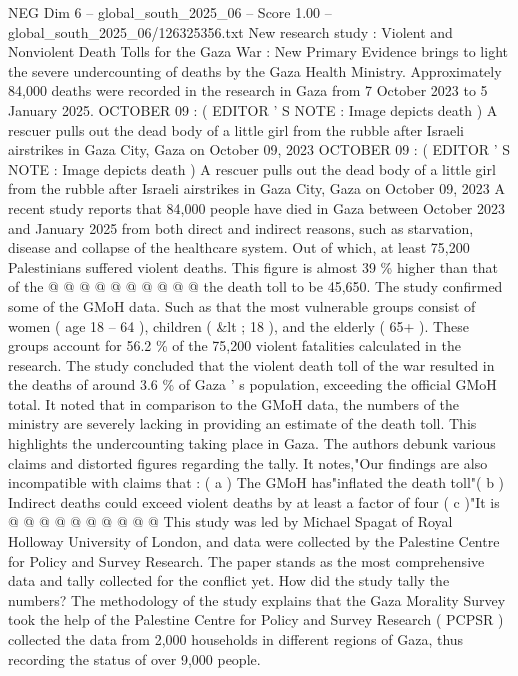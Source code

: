 \begin{textsample}{NEG Dim 6 – global\_south\_2025\_06 – Score 1.00 – global\_south\_2025\_06/126325356.txt}  \label{ex:f6_neg_434}
New research study : Violent and Nonviolent Death Tolls for the Gaza War : New Primary Evidence brings to light the severe undercounting of deaths by the Gaza Health Ministry.
Approximately 84,000 deaths were recorded in the research in Gaza from 7 October 2023 to 5 January 2025.
OCTOBER 09 : ( EDITOR ' S NOTE : Image depicts death ) A rescuer pulls out the dead body of a little girl from the rubble after Israeli airstrikes in Gaza City, Gaza on October 09, 2023 OCTOBER 09 : ( EDITOR ' S NOTE : Image depicts death ) A rescuer pulls out the dead body of a little girl from the rubble after Israeli airstrikes in Gaza City, Gaza on October 09, 2023 A recent study reports that 84,000 people have died in Gaza between October 2023 and January 2025 from both direct and indirect reasons, such as starvation, disease and collapse of the healthcare system.
Out of which, at least 75,200 Palestinians suffered violent deaths.
This figure is almost 39 \% higher than that of the @ @ @ @ @ @ @ @ @ @ the death toll to be 45,650.
The study confirmed some of the GMoH data.
Such as that the most vulnerable groups consist of women ( age 18 -- 64 ), children ( \&lt ; 18 ), and the elderly ( 65+ ).
These groups account for 56.2 \% of the 75,200 violent fatalities calculated in the research.
The study concluded that the violent death toll of the war resulted in the deaths of around 3.6 \% of Gaza ' s population, exceeding the official GMoH total.
It noted that in comparison to the GMoH data, the numbers of the ministry are severely lacking in providing an estimate of the death toll.
This highlights the undercounting taking place in Gaza.
The authors debunk various claims and distorted figures regarding the tally.
It notes,"Our findings are also incompatible with claims that : ( a ) The GMoH has"inflated the death toll"( b ) Indirect deaths could exceed violent deaths by at least a factor of four ( c )"It is @ @ @ @ @ @ @ @ @ @ This study was led by Michael Spagat of Royal Holloway University of London, and data were collected by the Palestine Centre for Policy and Survey Research.
The paper stands as the most comprehensive data and tally collected for the conflict yet.
How did the study tally the numbers?
The methodology of the study explains that the Gaza Morality Survey took the help of the Palestine Centre for Policy and Survey Research ( PCPSR ) collected the data from 2,000 households in different regions of Gaza, thus recording the status of over 9,000 people.

\end{textsample}
